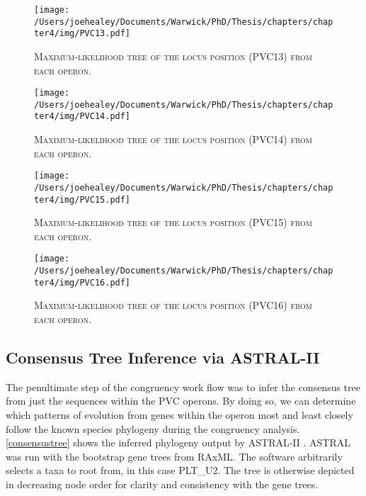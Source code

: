 \newpage
\begin{figure}[h!]
	\centering
	\texttt{[image: /Users/joehealey/Documents/Warwick/PhD/Thesis/chapters/chapter4/img/PVC13.pdf]}
	\captionsetup{singlelinecheck=off, justification=justified, font=footnotesize, aboveskip=19pt}
	\caption[Gene tree for the thirteenth PVC locus]{\textsc{\normalsize Maximum-likelihood tree of the locus position (PVC13) from each operon.}}
	\label{pvc13tree}
\end{figure}
\hfill
\begin{figure}[h!]
	\centering
	\texttt{[image: /Users/joehealey/Documents/Warwick/PhD/Thesis/chapters/chapter4/img/PVC14.pdf]}
	\captionsetup{singlelinecheck=off, justification=justified, font=footnotesize, aboveskip=19pt}
	\caption[Gene tree for the fourteenth PVC locus]{\textsc{\normalsize Maximum-likelihood tree of the locus position (PVC14) from each operon.}}
	\label{pvc14tree}
\end{figure}

\newpage
\begin{figure}[h!]
	\centering
	\texttt{[image: /Users/joehealey/Documents/Warwick/PhD/Thesis/chapters/chapter4/img/PVC15.pdf]}
	\captionsetup{singlelinecheck=off, justification=justified, font=footnotesize, aboveskip=19pt}
	\caption[Gene tree for the fifteenth PVC locus]{\textsc{\normalsize Maximum-likelihood tree of the locus position (PVC15) from each operon.}}
	\label{pvc15tree}
\end{figure}
\hfill
\begin{figure}[h!]
	\centering
	\texttt{[image: /Users/joehealey/Documents/Warwick/PhD/Thesis/chapters/chapter4/img/PVC16.pdf]}
	\captionsetup{singlelinecheck=off, justification=justified, font=footnotesize, aboveskip=19pt}
	\caption[Gene tree for the sixteenth PVC locus]{\textsc{\normalsize Maximum-likelihood tree of the locus position (PVC16) from each operon.}}
	\label{pvc16tree}
\end{figure}

\newpage

\subsection{Consensus Tree Inference via ASTRAL-II}
The penultimate step of the congruency work flow was to infer the consensus tree from just the sequences within the PVC operons. By doing so, we can determine which patterns of evolution from genes within the operon most and least closely follow the known species phylogeny during the congruency analysis. \vref{consensustree} shows the inferred phylogeny output by ASTRAL-II \citep{Mirarab2015}. ASTRAL was run with the bootstrap gene trees from RAxML. The software arbitrarily selects a taxa to root from, in this case PLT\_U2. The tree is otherwise depicted in decreasing node order for clarity and consistency with the gene trees.

